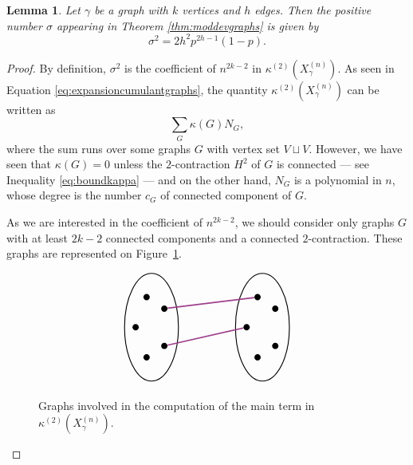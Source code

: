 \documentclass[12pt,a4paper,reqno]{amsart}
\newtheorem{lemma}{Lemma}[section]
\theoremstyle{remark}
\newcommand{\SubGraph}{X^{(n)}}
\begin{document}
\begin{lemma} 
Let $\gamma$ be a graph with $k$ vertices and $h$ edges. Then the positive number $\sigma$ appearing in Theorem \ref{thm:moddevgraphs} is given by $$\sigma^2 = 2 h^2 p^{2h-1} (1-p). $$
\end{lemma}

\begin{proof}
By definition, $\sigma^2$ is the coefficient of $n^{2k-2}$ in $\kappa^{(2)}(\SubGraph_\gamma)$. As seen in Equation \eqref{eq:expansioncumulantgraphs}, the quantity $\kappa^{(2)}(\SubGraph_\gamma)$ can be written as 
$$\sum_{G} \kappa(G) N_G,$$
where the sum runs over some graphs $G$ with vertex set $V \sqcup V$. However, we have seen that $\kappa(G)=0$ unless the $2$-contraction $H^2$ of $G$ is connected --- see Inequality \eqref{eq:boundkappa} --- and on the other hand, $N_G$ is a polynomial in $n$, whose degree is the number $c_G$ of connected component of $G$.
\bigskip

\noindent As we are interested in the coefficient of $n^{2k-2}$, we should consider only graphs $G$ with at least $2k-2$ connected components and a connected $2$-contraction. These graphs are represented on Figure~\ref{fig:computationsigma}.
\begin{figure}[ht]
    $$\begin{array}{c} 
        \begin{tikzpicture}
    \tikzstyle{vertex}=[circle,fill=black,inner sep=0pt,minimum size=2mm]
    \begin{scope}[xscale=.5]
        \node (v1) at (36:1) [vertex] {};
        \node (v2) at (108:1) [vertex] {};
        \node (v3) at (180:1) [vertex] {};
        \node (v4) at (-108:1) [vertex] {};
        \node (v5) at (-36:1) [vertex] {};
        \draw [line width=0.8pt] (0,0) circle (1.7);
    \end{scope}
    \begin{scope}[xshift= 3.5cm,xscale=.5]
        \node (v1b) at (36:1) [vertex] {};
        \node (v2b) at (108:1) [vertex] {};
        \node (v3b) at (180:1) [vertex] {};
        \node (v4b) at (-108:1) [vertex] {};
        \node (v5b) at (-36:1) [vertex] {};
        \draw [line width=0.8pt] (0,0) circle (1.7);
    \end{scope}
    \draw [line width=1.2pt,DarkOrchid] (v1) to (v2b);
    \draw [line width=1.2pt,DarkOrchid] (v5) to (v3b);
\end{tikzpicture}\end{array}$$
\caption{Graphs involved in the computation of the main term in $\kappa^{(2)}(\SubGraph_{\gamma})$.}
\label{fig:computationsigma}
\end{figure}


\end{proof}
\end{document}
